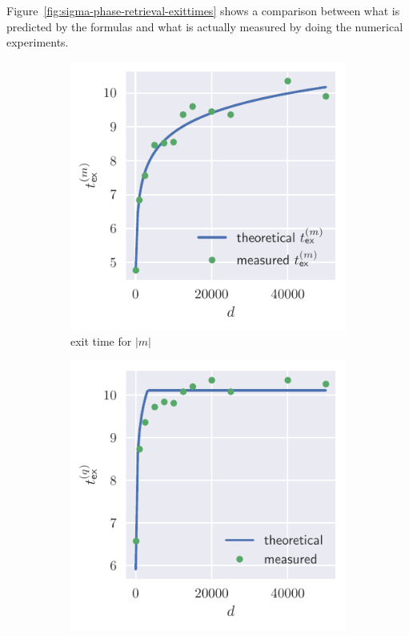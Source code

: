 Figure~\ref{fig:sigma-phase-retrieval-exittimes} shows a comparison between what is predicted by the formulas
and what is actually measured by doing the numerical experiments.
\begin{figure}
  \centering
  \begin{subfigure}{0.495\textwidth}
    \includegraphics[width=1.\textwidth]{figures/sigma-phase-retrieval-mexit.pdf}
    \caption{exit time for \(|m|\)}
  \end{subfigure}
  \begin{subfigure}{0.495\textwidth}
    \includegraphics[width=1.\textwidth]{figures/sigma-phase-retrieval-qexit.pdf}

\end{subfigure}
\end{figure}
